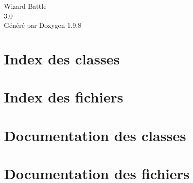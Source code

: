 \documentclass[twoside]{book}
\newcommand{\+}{\discretionary{\mbox{\scriptsize$\hookleftarrow$}}{}{}}
\newcommand{\clearemptydoublepage}{%
    \newpage{\pagestyle{empty}\cleardoublepage}%
  }
\begin{document}
  \raggedbottom
    \hypersetup{pageanchor=false,
                bookmarksnumbered=true,
                pdfencoding=unicode
               }
  \begin{titlepage}
  \vspace*{7cm}
  \begin{center}%
  {\Large Wizard Battle}\\
  [1ex]\large 3.\+0 \\
  \vspace*{1cm}
  {\large Généré par Doxygen 1.9.8}\\
  \end{center}
  \end{titlepage}
  \clearemptydoublepage
  \tableofcontents
  \clearemptydoublepage
  \hypersetup{pageanchor=true}

\chapter{Index des classes}

\chapter{Index des fichiers}

\chapter{Documentation des classes}











\chapter{Documentation des fichiers}























  \backmatter
  \newpage
  \clearemptydoublepage
  \printindex
\end{document}
